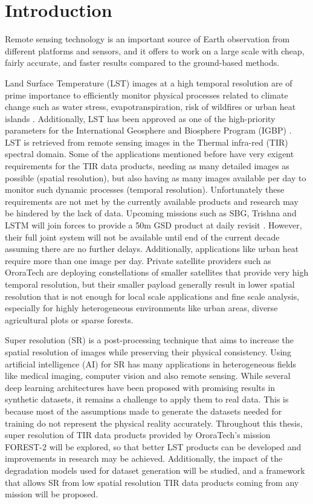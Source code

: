 \section{Introduction} \label{sec:intro}


Remote sensing technology is an important source of Earth observation from different platforms
and sensors, and it offers to work on a large scale with cheap, fairly accurate, and faster results compared to the ground-based methods.

Land Surface Temperature (LST) images at a high temporal resolution are of prime importance to efficiently monitor physical processes related to climate change such as water stress, evapotranspiration, risk of wildfires or urban heat islands \cite{lst2005}.
Additionally, LST has been approved as one of the high-priority parameters for the International Geosphere and Biosphere Program (IGBP) \cite{townshend94}.
LST is retrieved from remote sensing images in the Thermal infra-red (TIR) spectral domain.  
Some of the applications mentioned before have very exigent requirements for the TIR data products, needing as many detailed images as possible (spatial resolution), but also having as many images available per day to monitor such dynamic processes (temporal resolution).
Unfortunately these requirements are not met by the currently available products and research may be hindered by the lack of data. 
Upcoming missions such as SBG, Trishna and LSTM will join forces to provide a 50m GSD product at daily revisit \cite{author2023thermal}. However, their full joint system will not be available until end of the current decade assuming there are no further delays. Additionally, applications like urban heat require more than one image per day.
Private satellite providers such as OroraTech are deploying constellations of smaller satellites that provide very high temporal resolution, but their smaller payload generally result in lower spatial resolution that is not enough for local scale applications and fine scale analysis, especially for highly heterogeneous environments like urban areas, diverse agricultural plots or sparse forests.

Super resolution (SR) is a post-processing technique that aims to increase the spatial resolution of images while preserving their physical consistency.
Using artificial intelligence (AI) for SR has many applications in heterogeneous fields like medical imaging, computer vision and also remote sensing. 
While several deep learning architectures have been proposed with promising results in synthetic datasets, it remains a challenge to apply them to real data.
This is because most of the assumptions made to generate the datasets needed for training do not represent the physical reality accurately.
Throughout this thesis, super resolution of TIR data products provided by OroraTech's mission FOREST-2 will be explored, so that better LST products can be developed and improvements in research may be achieved.
Additionally, the impact of the degradation models used for dataset generation will be studied, and a framework that allows SR from low spatial resolution TIR data products coming from any mission will be proposed.
 
